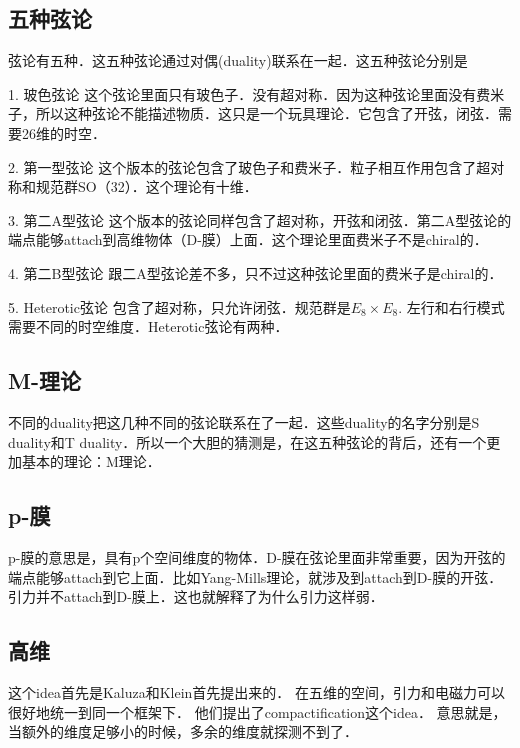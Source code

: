 \subsection{五种弦论}

弦论有五种．这五种弦论通过对偶(duality)联系在一起．这五种弦论分别是

1. 玻色弦论
这个弦论里面只有玻色子．没有超对称．因为这种弦论里面没有费米子，所以这种弦论不能描述物质．这只是一个玩具理论．它包含了开弦，闭弦．需要26维的时空．

2. 第一型弦论
这个版本的弦论包含了玻色子和费米子．粒子相互作用包含了超对称和规范群SO（32）．这个理论有十维．

3. 第二A型弦论
这个版本的弦论同样包含了超对称，开弦和闭弦．第二A型弦论的端点能够attach到高维物体（D-膜）上面．这个理论里面费米子不是chiral的．

4. 第二B型弦论
跟二A型弦论差不多，只不过这种弦论里面的费米子是chiral的．

5. Heterotic弦论
包含了超对称，只允许闭弦．规范群是$E_8\times E_8$. 左行和右行模式需要不同的时空维度．Heterotic弦论有两种．

\subsection{M-理论}
不同的duality把这几种不同的弦论联系在了一起．这些duality的名字分别是S duality和T duality．所以一个大胆的猜测是，在这五种弦论的背后，还有一个更加基本的理论：M理论．

\subsection{p-膜}
p-膜的意思是，具有p个空间维度的物体．D-膜在弦论里面非常重要，因为开弦的端点能够attach到它上面．比如Yang-Mills理论，就涉及到attach到D-膜的开弦． 引力并不attach到D-膜上．这也就解释了为什么引力这样弱．

\subsection{高维}
这个idea首先是Kaluza和Klein首先提出来的． 在五维的空间，引力和电磁力可以很好地统一到同一个框架下． 他们提出了compactification这个idea．
意思就是，当额外的维度足够小的时候，多余的维度就探测不到了． 
